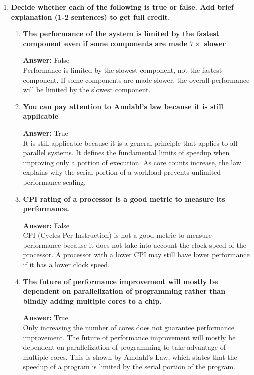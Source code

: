 \begin{enumerate}
\begin{enumerate}
          \end{enumerate}
    \item \textbf{Decide whether each of the following is true or false. Add brief explanation (1-2 sentences) to get full credit.}
          \begin{enumerate}
              \item \textbf{The performance of the system is limited by the fastest component even if some components are made $7\times$ slower}

                    \textbf{Answer:} False\\
                    Performance is limited by the slowest component, not the fastest component. If some components are made slower, the overall performance will be limited by the slowest component.

              \item \textbf{You can pay attention to Amdahl's law because it is still applicable}

                    \textbf{Answer:} True \\
                    It is still applicable because it is a general principle that applies to all parallel systems. It defines the fundamental limits of speedup when improving only a portion of execution. As core counts increase, the law explains why the serial portion of a workload prevents unlimited performance scaling.

              \item \textbf{CPI rating of a processor is a good metric to measure its performance.}

                    \textbf{Answer:} False \\
                    CPI (Cycles Per Instruction) is not a good metric to measure performance because it does not take into account the clock speed of the processor. A processor with a lower CPI may still have lower performance if it has a lower clock speed.

              \item \textbf{The future of performance improvement will mostly be dependent on parallelization of programming rather than blindly adding multiple cores to a chip.}

                    \textbf{Answer:} True \\
                    Only increasing the number of cores does not guarantee performance improvement. The future of performance improvement will mostly be dependent on parallelization of programming to take advantage of multiple cores. This is shown by Amdahl's Law, which states that the speedup of a program is limited by the serial portion of the program.
          \end{enumerate}


\end{enumerate}
